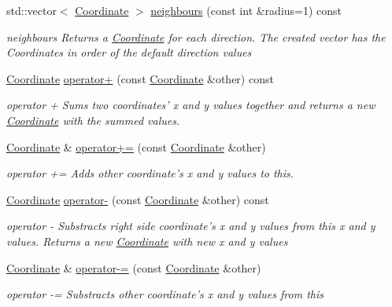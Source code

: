 \begin{DoxyCompactItemize}
std\-::vector$<$ \hyperlink{classCourse_1_1Coordinate}{Coordinate} $>$ \hyperlink{classCourse_1_1Coordinate_ac5986224eb9de393d427d7003e96889b}{neighbours} (const int \&radius=1) const 
\begin{DoxyCompactList}\small\item\em neighbours Returns a \hyperlink{classCourse_1_1Coordinate}{Coordinate} for each direction. The created vector has the Coordinates in order of the default direction values \end{DoxyCompactList}\item 
\hyperlink{classCourse_1_1Coordinate}{Coordinate} \hyperlink{classCourse_1_1Coordinate_a7edcfb76ac047152ab2e241833b3109b}{operator+} (const \hyperlink{classCourse_1_1Coordinate}{Coordinate} \&other) const 
\begin{DoxyCompactList}\small\item\em operator + Sums two coordinates' x and y values together and returns a new \hyperlink{classCourse_1_1Coordinate}{Coordinate} with the summed values. \end{DoxyCompactList}\item 
\hyperlink{classCourse_1_1Coordinate}{Coordinate} \& \hyperlink{classCourse_1_1Coordinate_aa9191a6d4f7093572be0a82764ef972f}{operator+=} (const \hyperlink{classCourse_1_1Coordinate}{Coordinate} \&other)
\begin{DoxyCompactList}\small\item\em operator += Adds other coordinate's x and y values to this. \end{DoxyCompactList}\item 
\hyperlink{classCourse_1_1Coordinate}{Coordinate} \hyperlink{classCourse_1_1Coordinate_af88f0780b55f3496322bdde1646d2e7f}{operator-\/} (const \hyperlink{classCourse_1_1Coordinate}{Coordinate} \&other) const 
\begin{DoxyCompactList}\small\item\em operator -\/ Substracts right side coordinate's x and y values from this x and y values. Returns a new \hyperlink{classCourse_1_1Coordinate}{Coordinate} with new x and y values \end{DoxyCompactList}\item 
\hyperlink{classCourse_1_1Coordinate}{Coordinate} \& \hyperlink{classCourse_1_1Coordinate_ab22b7e48298bdf3c493bdf33f750fc37}{operator-\/=} (const \hyperlink{classCourse_1_1Coordinate}{Coordinate} \&other)
\begin{DoxyCompactList}\small\item\em operator -\/= Substracts other coordinate's x and y values from this \end{DoxyCompactList}\item 

\end{DoxyCompactItemize}
